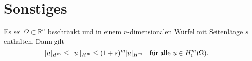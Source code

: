 \section{Sonstiges} %
\label{sec:sonstiges}

\begin{Satz}
    \label{satz:grundlagen:poincare_friedrichs_ungleichung}
    Es sei $\Omega \subset \mathbb{R}^{n}$ beschränkt und in einem $n$-dimensionalen Würfel mit Seitenlänge $s$ enthalten.
    Dann gilt
    \begin{equation}
        \label{eq:grundlagen:poincare_friedrichs_ungleichung}
        \lvert u\rvert_{H^{m}} \leq \lVert u\rVert_{H^{m}} \leq (1 + s)^{m} \lvert u\rvert_{H^{m}} \quad \text{für alle}~u \in H^{m}_{0}(\Omega).
    \end{equation}
\end{Satz}

